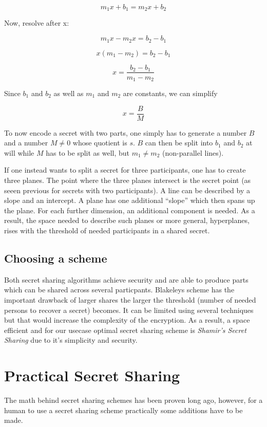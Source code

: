 $$m_1x + b_1 = m_2x + b_2$$

Now, resolve after x:

$$m_1x - m_2x = b_2 - b_1 $$

$$x (m_1 - m_2) = b_2 - b_1$$

$$x = \frac{b_2 - b_1}{m_1 - m_2}$$

Since $b_1$ and $b_2$ as well as $m_1$ and $m_2$ are constants, we can simplify

$$x = \frac{B}{M}$$

To now encode a secret with two parts, one simply has to generate a number $B$
and a number $M \neq 0$ whose quotient is $s$.
$B$ can then be split into $b_1$ and $b_2$ at will
while $M$ has to be split as well, but $m_1 \neq m_2$ (non-parallel lines).

If one instead wants to split a secret for three participants, one has to
create three planes. The point where the three planes intersect
is the secret point (as seeen previous for secrets with two participants).
A line can be described by a slope and an intercept. A plane has one
additional ``slope'' which then spans up the plane. For each further
dimension, an additional component is needed. As a result, the space needed
to describe such planes or more general, hyperplanes, rises with the
threshold of needed participants in a shared secret.

\subsection{Choosing a scheme}

Both secret sharing algorithms achieve security and are able to produce
parts which can be shared across several particpants. Blakeleys scheme
has the important drawback of larger shares the larger the threshold (number
of needed persons to recover a secret) becomes. It can be limited using
several techniques but that would increase the complexity of the encryption.
As a result, a space efficient and for our usecase optimal secret sharing
scheme is \textit{Shamir's Secret Sharing} due to it's simplicity and
security.

\section{Practical Secret Sharing}

The math behind secret sharing schemes has been proven long ago, however, for a
human to use a secret sharing scheme practically some additions have to be
made.

